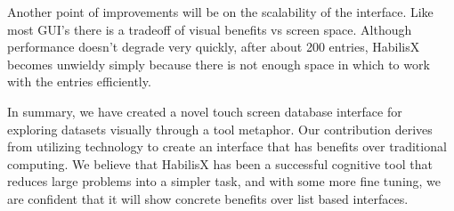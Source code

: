 \documentclass{article}
\begin{document}
Another point of improvements will be on the scalability of the interface.  Like most GUI's there is a tradeoff of visual benefits vs screen space.  Although performance doesn't degrade very quickly, after about 200 entries, HabilisX becomes unwieldy simply because there is not enough space in which to work with the entries efficiently.  

In summary, we have created a novel touch screen database interface for exploring datasets visually through a tool metaphor.  Our contribution derives from utilizing technology to create an interface that has benefits over traditional computing.  We believe that HabilisX has been a successful cognitive tool that reduces large problems into a simpler task, and with some more fine tuning, we are confident that it will show concrete benefits over list based interfaces.  





%
{}
\end{document}
